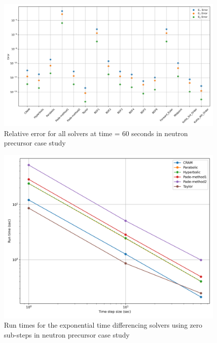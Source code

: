 \clearpage

\begin{figure}[p]
    \centering
    \includegraphics[width=5in]{images/chapter-5/caseStudies/neutronPrecursors/dt60/neutronPrecursorsAllSolverErrors.png}
    \caption{Relative error for all solvers at time = 60 seconds in neutron precursor case study}
    \label{fig:neutron_precursors_error_all_solvers}
\end{figure}

\clearpage

\begin{figure}[p]
    \centering
    \includegraphics[width=5in]{images/chapter-5/caseStudies/neutronPrecursors/neutronPrecursorsMatExpRuntimes.png}
    \caption{Run times for the exponential time differencing solvers using zero sub-steps in neutron precursor case study}
    \label{fig:neutron_precursors_mat_exp_runtimes}
\end{figure}

